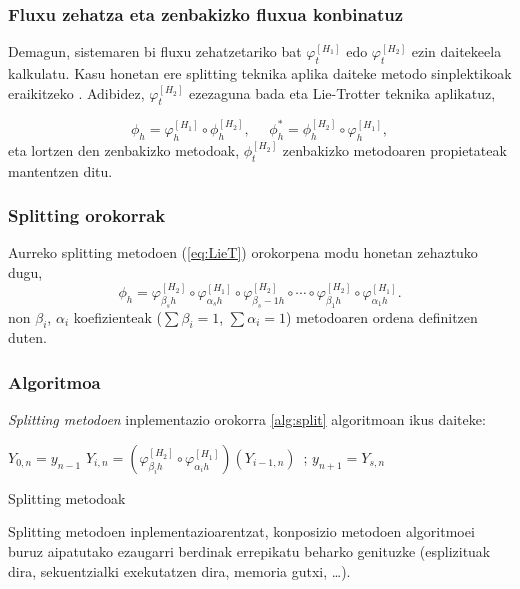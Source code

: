 \subsubsection*{Fluxu zehatza eta zenbakizko fluxua konbinatuz}
Demagun, sistemaren bi fluxu zehatzetariko bat $\varphi_t^{[H_1]}$ edo $\varphi_t^{[H_2]}$ ezin daitekeela kalkulatu. Kasu honetan ere splitting teknika aplika daiteke  metodo sinplektikoak eraikitzeko . Adibidez, $\varphi_t^{[H_2]}$ ezezaguna bada eta Lie-Trotter teknika aplikatuz,

\begin{equation*}
\phi_h=\varphi_h^{[H_1]} \circ \phi_h^{[H_2]}, \ \ \ \ \ \  \phi_h^{*}=\phi_h^{[H_2]} \circ \varphi_h^{[H_1]},
\end{equation*}
%
eta lortzen den zenbakizko metodoak, $\phi_t^{[H_2]}$ zenbakizko metodoaren propietateak mantentzen ditu. 

\subsubsection*{Splitting orokorrak}

Aurreko splitting metodoen (\ref{eq:LieT}) orokorpena modu honetan zehaztuko dugu,
\begin{equation}
\phi_h = \varphi_{\beta_s h}^{[H_2]} \circ \varphi_{\alpha_s h}^{[H_1]} \circ \varphi_{\beta_s-1 h}^{[H_2]} 
\circ \cdots \circ \varphi_{\beta_1 h}^{[H_2]} \circ \varphi_{\alpha_1 h}^{[H_1]} .
\end{equation}
%
non $\beta_i$, $\alpha_i$ koefizienteak ($\sum \beta_i=1$, $\sum \alpha_i=1$) metodoaren ordena definitzen duten.


\subsubsection*{Algoritmoa}

\emph{Splitting metodoen} inplementazio orokorra \ref{alg:split} algoritmoan ikus daiteke:

\begin{algorithm}[H]
 \BlankLine
  {
   \BlankLine
    $Y_{0,n}=y_{n-1} $\;
    \BlankLine
   {
    \BlankLine 
    $Y_{i,n}=(\varphi^{[H_2]}_{\beta_i h} \circ \varphi^{[H_1]}_{\alpha_i h})(Y_{i-1,n})$\ ;
   }
   \BlankLine
    $y_{n+1}=Y_{s,n}$\;
   \BlankLine
 }
 \caption{Splitting metodoak}
 \label{alg:split}
\end{algorithm}

Splitting metodoen inplementazioarentzat, konposizio metodoen algoritmoei buruz aipatutako ezaugarri berdinak errepikatu beharko genituzke (esplizituak dira, sekuentzialki exekutatzen dira, memoria gutxi, \dots). 

